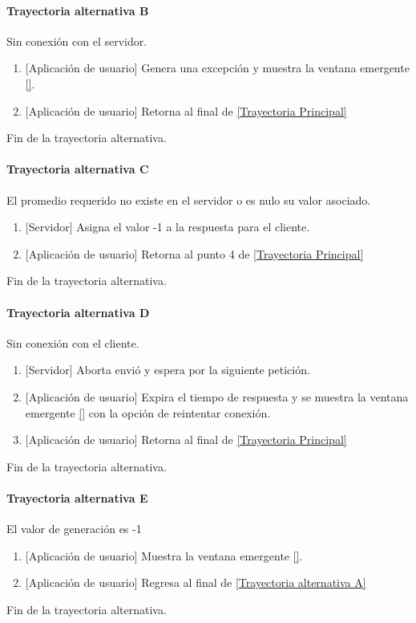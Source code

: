 \paragraph{Trayectoria alternativa B} \label{SUB-M-CU5:TB}
	Sin conexión con el servidor.
	\begin{enumerate}[label=B\arabic*.]
		\item {[Aplicación de usuario]} Genera una excepción y muestra la ventana emergente \ref{}.
		\item {[Aplicación de usuario]} Retorna al final de \hyperref[SUB-M-CU6:TP]{[Trayectoria Principal]} 
	\end{enumerate}
	Fin de la trayectoria alternativa.

\paragraph{Trayectoria alternativa C} \label{SUB-M-CU6:TC}
	El promedio requerido no existe en el servidor o es nulo su valor asociado.
	\begin{enumerate}[label=C\arabic*.]
		\item {[Servidor]} Asigna el valor -1 a la respuesta para el cliente.
		\item {[Aplicación de usuario]} Retorna al punto 4 de \hyperref[SUB-M-CU6:TP]{[Trayectoria Principal]}
	\end{enumerate}
	Fin de la trayectoria alternativa.

\paragraph{Trayectoria alternativa D} \label{SUB-M-CU6:TD}
	Sin conexión con el cliente.
	\begin{enumerate}[label=D\arabic*.]
		\item {[Servidor]} Aborta envió y espera por la siguiente petición.
		\item {[Aplicación de usuario]} Expira el tiempo de respuesta y se muestra la ventana emergente \ref{} con la opción de reintentar conexión.
		\item {[Aplicación de usuario]} Retorna al final de \hyperref[SUB-M-CU6:TP]{[Trayectoria Principal]} 
	\end{enumerate}
	Fin de la trayectoria alternativa.
	
\paragraph{Trayectoria alternativa E} \label{SUB-M-CU6:TE}
	El valor de generación es -1
	\begin{enumerate}[label=E\arabic*.]
		\item {[Aplicación de usuario]} Muestra la ventana emergente \ref{}.
		\item {[Aplicación de usuario]} Regresa al final de \hyperref[SUB-M-CU6:TA]{[Trayectoria alternativa A]}
	\end{enumerate}
	Fin de la trayectoria alternativa.